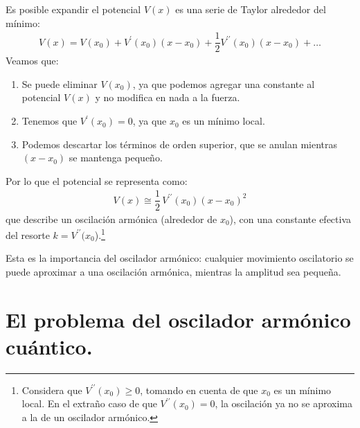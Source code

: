 \documentclass[12pt]{article}
\newcommand{\pderivada}[1]{\ensuremath{{#1}^{\prime}}}
\newcommand{\sderivada}[1]{\ensuremath{{#1}^{\prime \prime}}}
\numberwithin{equation}{section}
\begin{document}
Es posible expandir el potencial $V(x)$ es una serie de Taylor alrededor del mínimo:
\begin{align*}
V(x) = V(x_{0}) + \pderivada{V} (x_{0}) (x - x_{0}) + \dfrac{1}{2} \sderivada{V} (x_{0}) (x - x_{0}) + \ldots
\end{align*}
Veamos que:
\begin{enumerate}
\item Se puede eliminar $V(x_{0})$, ya que podemos agregar una constante al potencial $V(x)$ y no modifica en nada a la fuerza.
\item Tenemos que $\pderivada{V}(x_{0}) = 0$, ya que $x_{0}$ es un mínimo local.
\item Podemos descartar los términos de orden superior, que se anulan mientras $(x - x_{0})$ se mantenga pequeño.
\end{enumerate}
Por lo que el potencial se representa como:
\begin{align*}
V(x) \cong \dfrac{1}{2} \, \sderivada{V} (x_{0}) (x - x_{0})^{2}
\end{align*}
que describe un oscilación armónica (alrededor de $x_{0}$), con una constante efectiva del resorte $k = \sderivada{V} (x_{0}$).\footnote{Considera que $\sderivada{V}(x_{0})\geq 0$, tomando en cuenta de que $x_{0}$ es un mínimo local. En el extraño caso de que $\sderivada{V} (x_{0})= 0$, la oscilación ya no se aproxima a la de un oscilador armónico.}
\par
Esta es la importancia del oscilador armónico: cualquier movimiento oscilatorio se puede aproximar a una oscilación armónica, mientras la amplitud sea pequeña.

\section{El problema del oscilador armónico cuántico.}
\end{document}
